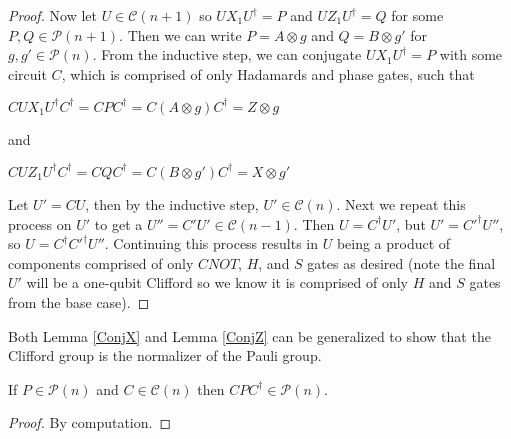 \documentclass[12pt]{dalthesis}
\begin{document}
\begin{proof}
Now let $U \in \mathcal{C}(n+1)$ so $UX_1U^\dag = P$ and $UZ_1U^\dag = Q$ for some $P, Q \in \mathcal{P}(n+1)$. Then we can write $P = A \otimes g$ and $Q = B \otimes g'$ for $g, g' \in \mathcal{P}(n)$. From the inductive step, we can conjugate $UX_1U^\dag = P$ with some circuit $C$, which is comprised of only Hadamards and phase gates, such that 
\begin{center}
$CUX_1U^\dag C^\dag = CPC^\dag = C(A \otimes g)C^\dag = Z \otimes g$
\end{center}
and 
\begin{center}
$CUZ_1U^\dag C^\dag = CQC^\dag = C(B \otimes g')C^\dag = X \otimes g'$
\end{center}
Let $U' = CU$, then by the inductive step, $U' \in \mathcal{C}(n)$. Next we repeat this process on $U'$ to get a $U'' = C'U' \in \mathcal{C}(n-1)$. Then $U = C^\dag U'$, but $U' = C'^\dag U''$, so $U = C^\dag C'^\dag U''$. Continuing this process results in $U$ being a product of components comprised of only $CNOT$, $H$, and $S$ gates as desired (note the final $U'$ will be a one-qubit Clifford so we know it is comprised of only $H$ and $S$ gates from the base case).
\end{proof}



%
%
%
%

Both Lemma \ref{ConjX} and Lemma \ref{ConjZ} can be generalized to show that the Clifford group is the normalizer of the Pauli group.

\begin{proposition}
If $P \in \mathcal{P}(n)$ and $C \in \mathcal{C}(n)$ then $CPC^{\dag} \in \mathcal{P}(n)$.
\end{proposition}
\begin{proof}
By computation.
\end{proof}
\end{document}
